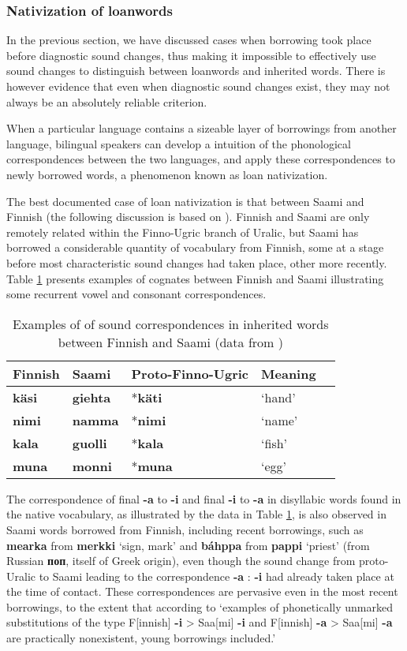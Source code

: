 \documentclass[oneside,a4paper,11pt]{article}
\newcommand{\ipa}[1]{\textbf{{\phon\mbox{#1}}}}
\begin{document}
\subsubsection{Nativization of loanwords}
In the previous section, we have discussed cases when borrowing took place before diagnostic sound changes, thus making it impossible to effectively use sound changes to distinguish between loanwords and inherited words. There is however evidence that even when diagnostic sound changes exist, they may not always be an absolutely reliable criterion.

When a particular language contains a sizeable layer of borrowings from another language, bilingual speakers can develop a intuition of the phonological correspondences between the two languages, and apply these correspondences to newly borrowed words, a phenomenon known as loan nativization.

The best documented case of loan nativization is that between Saami and Finnish (the following discussion is based on \citealt{aikio06nativization}). Finnish and Saami are only remotely related within the Finno-Ugric branch of Uralic, but  Saami has borrowed a considerable quantity of vocabulary from Finnish, some at a stage before most characteristic sound changes had taken place, other more recently. Table \ref{tab:native} presents examples of cognates between Finnish and Saami illustrating some recurrent vowel and consonant correspondences.

\begin{table}[h]
\caption{Examples of of sound correspondences in inherited words between Finnish and Saami (data from \citealt[27]{aikio06nativization})} \centering \label{tab:native}
\begin{tabular}{lllll}
\toprule
Finnish & Saami & Proto-Finno-Ugric & Meaning \\
\midrule
\ipa{käsi} & \ipa{giehta} & *\ipa{käti} & `hand' \\
\ipa{nimi} & \ipa{namma} & *\ipa{nimi} & `name' \\
\ipa{kala} & \ipa{guolli} & *\ipa{kala} & `fish' \\
\ipa{muna} & \ipa{monni} & *\ipa{muna} & `egg' \\
\bottomrule
\end{tabular}
\end{table}

The correspondence of final \ipa{-a} to \ipa{-i} and final \ipa{-i} to \ipa{-a} in disyllabic words found in the native vocabulary, as illustrated by the data in Table \ref{tab:native}, is also observed in Saami words borrowed from Finnish, including recent borrowings, such as \ipa{mearka} from \ipa{merkki} `sign, mark' and \ipa{báhppa} from \ipa{pappi} `priest' (from Russian \ipa{поп}, itself of Greek origin), even though the sound change from proto-Uralic to Saami leading to the correspondence \ipa{-a} : \ipa{-i} had already taken place at the time of contact. These correspondences are pervasive even in the most recent borrowings, to the extent that according to \citet[36]{aikio06nativization} `examples of phonetically unmarked substitutions of the type F[innish] \ipa{-i} > Saa[mi] \ipa{-i} and F[innish] \ipa{-a} > Saa[mi] \ipa{-a} are practically nonexistent, young borrowings included.'
\end{document}
